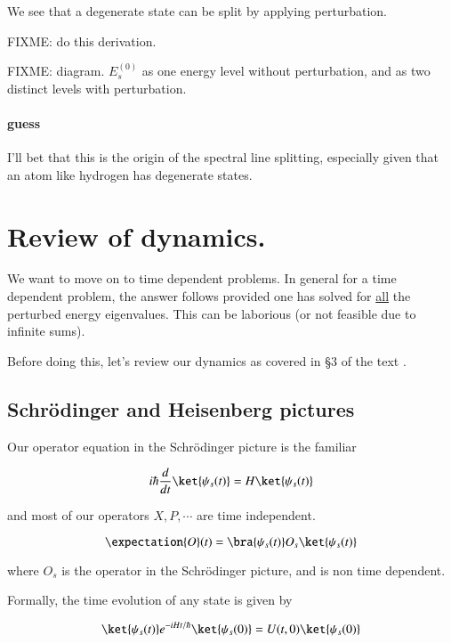 We see that a degenerate state can be split by applying perturbation.

FIXME: do this derivation.

FIXME: diagram.  $E_s^{(0)}$ as one energy level without perturbation, and as two distinct levels with perturbation.

\paragraph{guess} I'll bet that this is the origin of the spectral line splitting, especially given that an atom like hydrogen has degenerate states.

\section{Review of dynamics.}

We want to move on to time dependent problems.  In general for a time dependent problem, the answer follows provided one has solved for \underline{all} the perturbed energy eigenvalues.  This can be laborious (or not feasible due to infinite sums).

Before doing this, let's review our dynamics as covered in \S 3 of the text \cite{desai2009quantum}.

\subsection{Schr\"{o}dinger and Heisenberg pictures}

Our operator equation in the Schr\"{o}dinger picture is the familiar

\begin{equation}\label{eqn:qmTwoL5:220}
i \hbar \frac{d}{dt} \ket{\psi_s(t)} = H \ket{\psi_s(t)}
\end{equation}

and most of our operators $X, P, \cdots$ are time independent.

\begin{equation}\label{eqn:qmTwoL5:240}
\expectation{O}(t) = 
\bra{\psi_s(t)} O_s
\ket{\psi_s(t)}
\end{equation}

where $O_s$ is the operator in the Schr\"{o}dinger picture, and is non time dependent.

Formally, the time evolution of any state is given by

\begin{equation}\label{eqn:qmTwoL5:260}
\ket{\psi_s(t)}
e^{-i H t/\hbar}
\ket{\psi_s(0)} = U(t, 0) \ket{\psi_s(0)} 
\end{equation}

